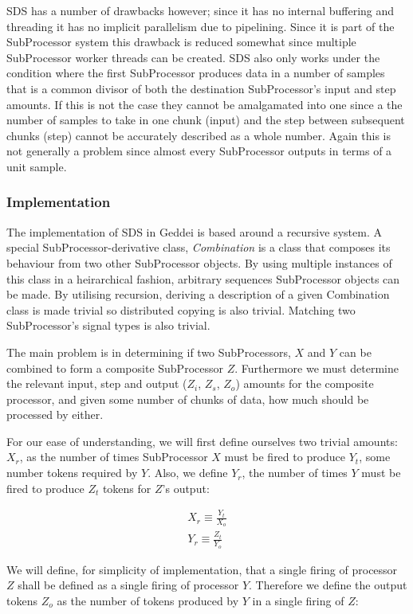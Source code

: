 SDS has a number of drawbacks however; since it has no internal buffering and threading it has no implicit parallelism due to pipelining. Since it is part of the SubProcessor system this drawback is reduced somewhat since multiple SubProcessor worker threads can be created. SDS also only works under the condition where the first SubProcessor produces data in a number of samples that is a common divisor of both the destination SubProcessor's input and step amounts. If this is not the case they cannot be amalgamated into one since a the number of samples to take in one chunk (input) and the step between subsequent chunks (step) cannot be accurately described as a whole number. Again this is not generally a problem since almost every SubProcessor outputs in terms of a unit sample.

\subsubsection{Implementation}

The implementation of SDS in Geddei is based around a recursive system. A special SubProcessor-derivative class, \textit{Combination} is a class that composes its behaviour from two other SubProcessor objects. By using multiple instances of this class in a heirarchical fashion, arbitrary sequences SubProcessor objects can be made. By utilising recursion, deriving a description of a given Combination class is made trivial so distributed copying is also trivial. Matching two SubProcessor's signal types is also trivial.

The main problem is in determining if two SubProcessors, $X$ and $Y$ can be combined to form a composite SubProcessor $Z$. Furthermore we must determine the relevant input, step and output ($Z_i$, $Z_s$, $Z_o$) amounts for the composite processor, and given some number of chunks of data, how much should be processed by either.

For our ease of understanding, we will first define ourselves two trivial amounts: $X_r$, as the number of times SubProcessor $X$ must be fired to produce $Y_t$, some number tokens required by $Y$. Also, we define $Y_r$, the number of times $Y$ must be fired to produce $Z_t$ tokens for $Z$'s output:

\begin{eqnarray}
X_r \equiv \frac{Y_t}{X_o} \\
Y_r \equiv \frac{Z_t}{Y_o}
\end{eqnarray}

We will define, for simplicity of implementation, that a single firing of processor $Z$ shall be defined as a single firing of processor $Y$. Therefore we define the output tokens $Z_o$ as the number of tokens produced by $Y$ in a single firing of $Z$:


